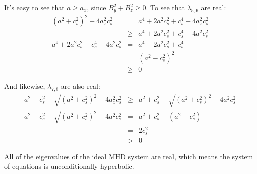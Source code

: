 \documentclass[10pt,letterpaper,notitlepage]{report}
\begin{document}
It's easy to see that $a \geq a_x$, since $B_y ^2 + B_z ^2 \geq 0$. To see that $\lambda_{5, 6}$ are real:
\begin{eqnarray}
(a^2 + c_s ^2) ^2 - 4 a_x ^2 c_s ^2 & = & a^4 + 2a^2 c_s^2 + c_s ^4 - 4 a_x ^2 c_s ^2 \\
& \geq & a^4 + 2 a^2 c_s^2 + c_s ^4 - 4 a ^2 c_s ^2 \\
a^4 + 2 a^2 c_s^2 + c_s ^4 - 4 a ^2 c_s ^2 & = & a^4 - 2 a^2 c_s ^2 + c_s ^4 \\
& = & (a^2 - c_s^2)^2 \\
& \geq & 0
\end{eqnarray}

And likewise, $\lambda_{7, 8}$ are also real:
\begin{eqnarray}
a^2 + c_s ^2 - \sqrt{(a^2 + c_s ^2)^2 - 4 a_x ^2 c_s ^2} & \geq & a^2 + c_s ^2 - \sqrt{(a^2 + c_s ^2)^2 - 4 a ^2 c_s ^2} \\
a^2 + c_s ^2 - \sqrt{(a^2 + c_s ^2)^2 - 4 a ^2 c_s ^2} & = & a^2 + c_s ^2 - (a^2 - c_s ^2) \\
& = & 2 c_s ^2 \\
& > & 0
\end{eqnarray}

All of the eigenvalues of the ideal MHD system are real, which means the system of equations is unconditionally hyperbolic.
\end{document}

